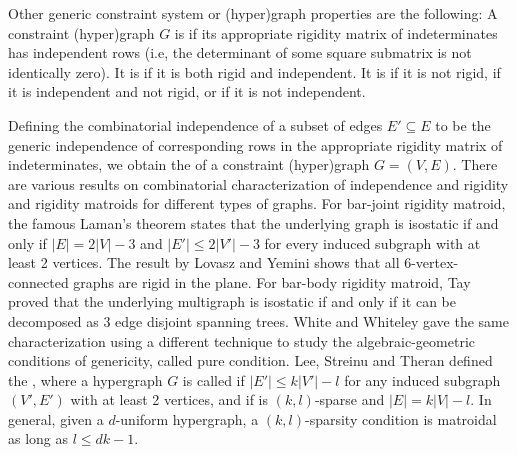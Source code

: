 Other generic constraint system or (hyper)graph properties are the following:
A constraint (hyper)graph $G$ is  if its appropriate rigidity matrix of indeterminates has independent rows (i.e, the determinant of some square submatrix is not identically zero).
It is  if it is both rigid and independent.
It is  if it is not rigid,  if it is independent and not rigid, or  if it is not independent.

Defining the combinatorial independence of a subset of edges $E'\subseteq E$ to be the generic independence of corresponding rows in the appropriate rigidity matrix of indeterminates, we obtain the  of a constraint (hyper)graph $G = (V,E)$.
There are various results on combinatorial characterization of independence and rigidity  and rigidity matroids for different types of graphs. For bar-joint rigidity matroid, the famous Laman's theorem \cite{laman1970graphs} states that the underlying graph is isostatic if and only if $|E| = 2|V|-3$ and $|E'| \le 2|V'|-3$ for every induced subgraph with at least 2 vertices. The result by Lovasz and Yemini \cite{lovasz1982generic}  shows that all 6-vertex-connected graphs are rigid in the plane. For bar-body rigidity matroid, Tay \cite{tay1976rigidity} proved that the underlying multigraph is isostatic if and only if it can be decomposed as $3$ edge disjoint spanning trees. White and Whiteley \cite{white1987algebraic} gave the same characterization using a different technique to study the algebraic-geometric conditions of genericity, called pure condition. Lee, Streinu and Theran \cite{lee2007graded} defined the , where a hypergraph $G$ is called  if $|E'| \le k|V'| - l$ for any induced subgraph $(V',E')$ with at least 2 vertices, and  if is $(k,l)$-sparse and $|E| = k|V| - l$. In general, given a $d$-uniform hypergraph, a $(k,l)$-sparsity condition is matroidal as long as $l \le dk-1$.



